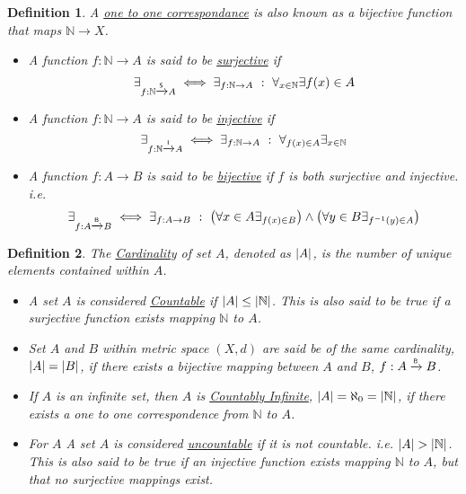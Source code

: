 \documentclass[]{article}
\newcommand{\N}{\mathbb{N}}
\newcommand{\toI}{\xrightarrow{\textsf{\tiny I}}}
\newcommand{\toS}{\xrightarrow{\textsf{\tiny S}}}
\newcommand{\toB}{\xrightarrow{\textsf{\tiny B}}}
\newcommand{\st}{\ : \ }
\newtheorem{definition}{Definition}
\begin{document}
\begin{definition}\label{def:sur/in/bijective_funcs}
    A \emph{\underline{one to one correspondance}} is also known as a 
    bijective function that maps $\N \to X$.
    \begin{itemize}
        \item A function $f : \N \to A$ is said to be \underline{\emph{surjective}} if\[
            \exists_{f : \N \toS A} \iff 
            \exists_{f : \N \to A} \st \forall_{x \in \N} \exists f(x) \in A
        \]

        \item A function $f : \N \to A$ is said to be \underline{\emph{injective}} if\[
            \exists_{f : \N \toI A} \iff 
            \exists_{f : \N \to A} \st \forall_{f(x) \in A} \exists_{x \in \N}
        \]

        \item A function $f : A \to B$ is said to be \underline{\emph{bijective}} 
        if $f$ is both surjective and injective.
        i.e.\[
            \exists_{f : A \toB B} \iff 
            \exists_{f : A \to B} \st 
                \qty(\forall{x \in A} \exists_{f(x) \in B}) \land
                \qty(\forall{y \in B} \exists_{f^{-1}(y) \in A})
        \]
    \end{itemize}
\end{definition}

\begin{definition}\label{def:cardinalityAndCountable}
    The \emph{\underline{Cardinality}} of set $A$,
        denoted as $\abs{A}$,
        is the number of unique elements contained within $A$.
    \begin{itemize}
        \item A set $A$ is considered \emph{\underline{Countable}} if $\abs{A} \leq \abs{\N}$. 
        This is also said to be true if a surjective function exists mapping $\N$ to $A$.
        
        \item Set $A$ and $B$ within metric space $(X,d)$ are said be of the same cardinality,
        $\abs{A}=\abs{B}$, 
        if there exists a bijective mapping between $A$ and $B$, $f : A \toB B$.

        \item If $A$ is an infinite set, then $A$ is \emph{\underline{Countably Infinite}},
        $\abs{A} = \aleph_0 = \abs{\N}$, 
        if there exists a one to one correspondence from $\N$ to $A$.
        
        \item For $A$ A set $A$ is considered \emph{\underline{uncountable}} if it is not countable.
        i.e. $\abs{A} > \abs{\N}$. 
        This is also said to be true if an injective function exists mapping $\N$ to $A$, 
        but that no surjective mappings exist.
    \end{itemize}
\end{definition}
\end{document}

